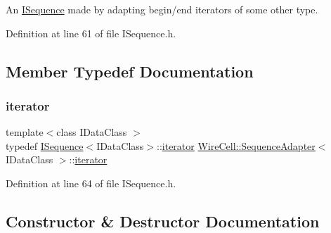 An \hyperlink{class_wire_cell_1_1_i_sequence}{I\+Sequence} made by adapting begin/end iterators of some other type. 

Definition at line 61 of file I\+Sequence.\+h.



\subsection{Member Typedef Documentation}
\mbox{\label{class_wire_cell_1_1_sequence_adapter_aa277763ddf95ebdd40224c15863b2bbd}} 
\subsubsection{\texorpdfstring{iterator}{iterator}}
{\footnotesize\ttfamily template$<$class I\+Data\+Class $>$ \\
typedef \hyperlink{class_wire_cell_1_1_i_sequence}{I\+Sequence}$<$I\+Data\+Class$>$\+::\hyperlink{class_wire_cell_1_1_sequence_adapter_aa277763ddf95ebdd40224c15863b2bbd}{iterator} \hyperlink{class_wire_cell_1_1_sequence_adapter}{Wire\+Cell\+::\+Sequence\+Adapter}$<$ I\+Data\+Class $>$\+::\hyperlink{class_wire_cell_1_1_sequence_adapter_aa277763ddf95ebdd40224c15863b2bbd}{iterator}}



Definition at line 64 of file I\+Sequence.\+h.



\subsection{Constructor \& Destructor Documentation}
\mbox{\label{class_wire_cell_1_1_sequence_adapter_a933b507395ec8309d0cbc54638a8bee5}} 
